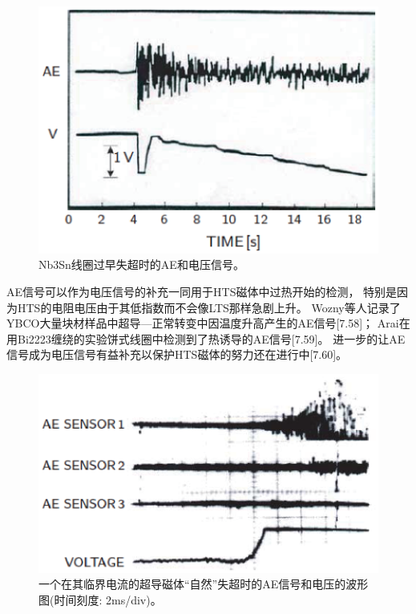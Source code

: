 \begin{figure}[htbp]
	\centering
	\includegraphics[scale=0.6]{chpt7/figs/fig7.8.eps}
	\caption{Nb3Sn线圈过早失超时的AE和电压信号。}
\end{figure}

AE信号可以作为电压信号的补充一同用于HTS磁体中过热开始的检测，
特别是因为HTS的电阻电压由于其低指数而不会像LTS那样急剧上升。
Wozny等人记录了YBCO大量块材样品中超导---正常转变中因温度升高产生的AE信号[7.58]；
Arai在用Bi2223缠绕的实验饼式线圈中检测到了热诱导的AE信号[7.59]。
进一步的让AE信号成为电压信号有益补充以保护HTS磁体的努力还在进行中[7.60]。

\begin{figure}[htbp]
	\centering
	\includegraphics[scale=0.6]{chpt7/figs/fig7.9.eps}
	\caption{一个在其临界电流的超导磁体“自然”失超时的AE信号和电压的波形图(时间刻度: 2ms/div)。}
\end{figure}

